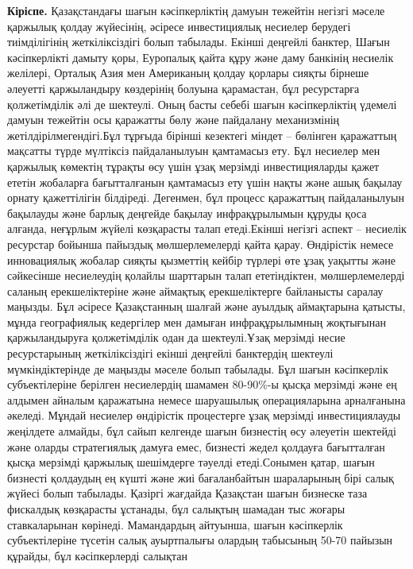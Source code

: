 \begin{multicols}{2}
{\bfseries Кіріспе.} Қазақстандағы шағын кәсіпкерліктің дамуын тежейтін
негізгі мәселе қаржылық қолдау жүйесінің, әсіресе инвестициялық несиелер
берудегі тиімділігінің жеткіліксіздігі болып табылады. Екінші деңгейлі
банктер, Шағын кәсіпкерлікті дамыту қоры, Еуропалық қайта құру және даму
банкінің несиелік желілері, Орталық Азия мен Американың қолдау қорлары
сияқты бірнеше әлеуетті қаржыландыру көздерінің болуына қарамастан, бұл
ресурстарға қолжетімділік әлі де шектеулі. Оның басты себебі шағын
кәсіпкерліктің үдемелі дамуын тежейтін осы қаражатты бөлу және пайдалану
механизмінің жетілдірілмегендігі.Бұл тұрғыда бірінші кезектегі міндет --
бөлінген қаражаттың мақсатты түрде мүлтіксіз пайдаланылуын қамтамасыз
ету. Бұл несиелер мен қаржылық көмектің тұрақты өсу үшін ұзақ мерзімді
инвестицияларды қажет ететін жобаларға бағытталғанын қамтамасыз ету үшін
нақты және ашық бақылау орнату қажеттілігін білдіреді. Дегенмен, бұл
процесс қаражаттың пайдаланылуын бақылауды және барлық деңгейде бақылау
инфрақұрылымын құруды қоса алғанда, неғұрлым жүйелі көзқарасты талап
етеді.Екінші негізгі аспект -- несиелік ресурстар бойынша пайыздық
мөлшерлемелерді қайта қарау. Өндірістік немесе инновациялық жобалар
сияқты қызметтің кейбір түрлері өте ұзақ уақытты және сәйкесінше
несиелеудің қолайлы шарттарын талап ететіндіктен, мөлшерлемелерді
саланың ерекшеліктеріне және аймақтық ерекшеліктерге байланысты саралау
маңызды. Бұл әсіресе Қазақстанның шалғай және ауылдық аймақтарына
қатысты, мұнда географиялық кедергілер мен дамыған инфрақұрылымның
жоқтығынан қаржыландыруға қолжетімділік одан да шектеулі.Ұзақ мерзімді
несие ресурстарының жеткіліксіздігі екінші деңгейлі банктердің шектеулі
мүмкіндіктерінде де маңызды мәселе болып табылады. Бұл шағын кәсіпкерлік
субъектілеріне берілген несиелердің шамамен 80-90\%-ы қысқа мерзімді
және ең алдымен айналым қаражатына немесе шаруашылық операцияларына
арналғанына әкеледі. Мұндай несиелер өндірістік процестерге ұзақ
мерзімді инвестициялауды жеңілдете алмайды, бұл сайып келгенде шағын
бизнестің өсу әлеуетін шектейді және оларды стратегиялық дамуға емес,
бизнесті жедел қолдауға бағытталған қысқа мерзімді қаржылық шешімдерге
тәуелді етеді.Сонымен қатар, шағын бизнесті қолдаудың ең күшті және жиі
бағаланбайтын шараларының бірі салық жүйесі болып табылады. Қазіргі
жағдайда Қазақстан шағын бизнеске таза фискалдық көзқарасты ұстанады,
бұл салықтың шамадан тыс жоғары ставкаларынан көрінеді. Мамандардың
айтуынша, шағын кәсіпкерлік субъектілеріне түсетін салық ауыртпалығы
олардың табысының 50-70 пайызын құрайды, бұл кәсіпкерлерді салықтан

\end{multicols}

